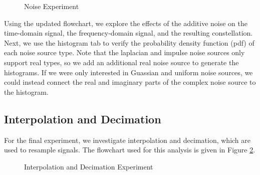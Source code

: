 \documentclass{article}
\begin{document}
\begin{figure}[H]
	\centerline{}
	\caption{Noise Experiment}
	\label{fig::noise_experiment}
\end{figure}

Using the updated flowchart, we explore the effects of the additive noise on the time-domain signal, the frequency-domain signal, and the resulting constellation. Next, we use the histogram tab to verify the probability density function (pdf) of each noise source type. Note that the laplacian and impulse noise sources only support real types, so we add an additional real noise source to generate the histograms. If we were only interested in Guassian and uniform noise sources, we could instead connect the real and imaginary parts of the complex noise source to the histogram. 


\subsection{Interpolation and Decimation}

For the final experiment, we investigate interpolation and decimation, which are used to resample signals. The flowchart used for this analysis is given in Figure \ref{fig::interpolation_and_decimation_experiment}.

\begin{figure}[H]
	\centerline{}
	\caption{Interpolation and Decimation Experiment}
	\label{fig::interpolation_and_decimation_experiment}
\end{figure}
\end{document}
